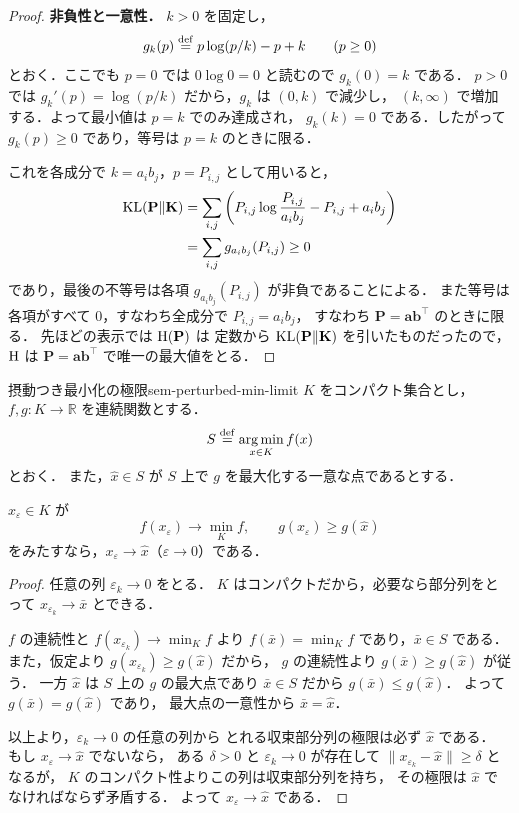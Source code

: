 \begin{proof}
  \textbf{非負性と一意性．}
  $k > 0$ を固定し，
  \[
    g_k(p) \overset{\mathrm{def}}{=} p\log(p/k) - p + k \qquad (p \geq 0)
  \]
  とおく．ここでも $p=0$ では $0\log0=0$ と読むので $g_k(0)=k$ である．
  $p>0$ では $g_k'(p)=\log(p/k)$ だから，$g_k$ は $(0,k)$ で減少し，
  $(k,\infty)$ で増加する．よって最小値は $p=k$ でのみ達成され，
  $g_k(k)=0$ である．したがって $g_k(p)\geq0$ であり，等号は $p=k$ のときに限る．

  これを各成分で $k=a_i b_j$，$p=P_{i,j}$ として用いると，
  \[
  \begin{aligned}
    \mathrm{KL}(\mathbf{P}\|\mathbf{K})
    &=
    \sum_{i,j}
    \left(
      P_{i,j}\log\frac{P_{i,j}}{a_i b_j}
      - P_{i,j}
      + a_i b_j
    \right) \\
    &=
    \sum_{i,j} g_{a_i b_j}(P_{i,j})
    \geq 0
  \end{aligned}
  \]
  であり，最後の不等号は各項 $g_{a_i b_j}(P_{i,j})$ が非負であることによる．
  また等号は各項がすべて $0$，すなわち全成分で $P_{i,j}=a_i b_j$，
  すなわち $\mathbf{P}=\mathbf{a}\mathbf{b}^\top$ のときに限る．
  先ほどの表示では $\mathrm{H}(\mathbf{P})$ は
  定数から $\mathrm{KL}(\mathbf{P}\|\mathbf{K})$ を引いたものだったので，
  $\mathrm{H}$ は $\mathbf{P} = \mathbf{a}\mathbf{b}^\top$ で唯一の最大値をとる．
\end{proof}

\begin{lemma}{摂動つき最小化の極限}{sem-perturbed-min-limit}
  $K$ をコンパクト集合とし，$f, g \colon K \to \mathbb{R}$ を連続関数とする．
  \[
    S \overset{\mathrm{def}}{=} \operatorname*{arg\,min}_{x \in K} f(x)
  \]
  とおく．
  また，$\hat{x} \in S$ が $S$ 上で $g$ を最大化する一意な点であるとする．

  $x_\varepsilon \in K$ が
  \[
    f(x_\varepsilon) \to \min_K f,
    \qquad
    g(x_\varepsilon) \geq g(\hat{x})
  \]
  をみたすなら，$x_\varepsilon \to \hat{x}$（$\varepsilon \to 0$）である．
\end{lemma}

\begin{proof}
  任意の列 $\varepsilon_k \to 0$ をとる．
  $K$ はコンパクトだから，必要なら部分列をとって
  $x_{\varepsilon_k} \to \bar{x}$ とできる．

  $f$ の連続性と $f(x_{\varepsilon_k}) \to \min_K f$ より
  $f(\bar{x}) = \min_K f$ であり，$\bar{x} \in S$ である．
  また，仮定より $g(x_{\varepsilon_k}) \geq g(\hat{x})$ だから，
  $g$ の連続性より $g(\bar{x}) \geq g(\hat{x})$ が従う．
  一方 $\hat{x}$ は $S$ 上の $g$ の最大点であり $\bar{x} \in S$ だから
  $g(\bar{x}) \leq g(\hat{x})$．
  よって $g(\bar{x}) = g(\hat{x})$ であり，
  最大点の一意性から $\bar{x} = \hat{x}$．

  以上より，$\varepsilon_k \to 0$ の任意の列から
  とれる収束部分列の極限は必ず $\hat{x}$ である．
  もし $x_\varepsilon \to \hat{x}$ でないなら，
  ある $\delta > 0$ と $\varepsilon_k \to 0$ が存在して
  $\|x_{\varepsilon_k} - \hat{x}\| \geq \delta$ となるが，
  $K$ のコンパクト性よりこの列は収束部分列を持ち，
  その極限は $\hat{x}$ でなければならず矛盾する．
  よって $x_\varepsilon \to \hat{x}$ である．
\end{proof}

